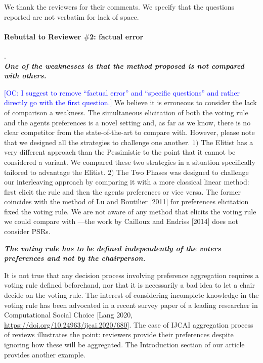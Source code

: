 \documentclass{article}
\newcommand{\commentOC}[1]{\textcolor{blue}{\small$\big[$OC: #1$\big]$}}
\begin{document}
\addtocounter{pagecount}{-4}

	We thank the reviewers for their comments. We specify that the questions reported are not verbatim for lack of space. 
\paragraph{Rebuttal to Reviewer $\#$2: factual error}.\\
\textit{\textbf{One of the weaknesses is that the method proposed is not compared with others.}}

\commentOC{I suggest to remove “factual error” and “specific questions” and rather directly go with the first question.}
We believe it is erroneous to consider the lack of comparison a weakness. The simultaneous elicitation of both the voting rule and the agents preferences is a novel setting and, as far as we know, there is no clear competitor from the state-of-the-art to compare with. However, please note that we designed all the strategies to challenge one another. $1)$ The Elitist has a very different approach than the Pessimistic to the point that it cannot be considered a variant. We compared these two strategies in a situation specifically tailored to advantage the Elitist. $2)$ The Two Phases was designed to challenge our interleaving approach by comparing it with a more classical linear method: first elicit the rule and then the agents preferences or vice versa. The former coincides with the method of Lu and Boutilier [2011] for preferences elicitation fixed the voting rule.
We are not aware of any method that elicits the voting rule we could compare with —the work by Cailloux and Endriss [2014] does not consider PSRs.

\textit{\textbf{The voting rule has to be defined independently of the voters preferences and not by the chairperson.}}

It is not true that any decision process involving preference aggregation requires a voting rule defined beforehand, nor that it is necessarily a bad idea to let a chair decide on the voting rule. The interest of considering incomplete knowledge in the voting rule has been advocated in a recent survey paper of a leading researcher in Computational Social Choice [Lang 2020, \url{https://doi.org/10.24963/ijcai.2020/680}]. The case of IJCAI aggregation process of reviews illustrates the point: reviewers provide their preferences despite ignoring how these will be aggregated. The Introduction section of our article provides another example.
\end{document}
